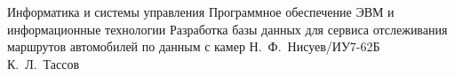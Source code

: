 \makecourseworktitle
    {Информатика и системы управления}
    {Программное обеспечение ЭВМ и информационные технологии}
    {Разработка базы данных для сервиса отслеживания маршрутов автомобилей по данным с камер}
    {Н.~Ф.~Нисуев/ИУ7-62Б}
    {К.~Л.~Тассов}
    { }
